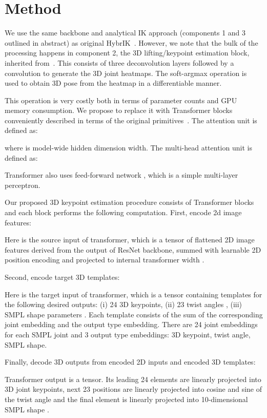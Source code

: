 \documentclass[sigconf,final]{acmart}
\begin{document}
\section{Method}

We use the same backbone and analytical IK approach (components 1 and 3 outlined in abstract) as original HybrIK~\cite{li2021hybrik}. However, we note that the bulk of the processing happens in component 2, the 3D lifting/keypoint estimation block, inherited from~\cite{integral}. This consists of three deconvolution layers followed by a  convolution to generate the 3D joint heatmaps. The soft-argmax operation is used to obtain 3D pose from the heatmap in a differentiable manner. 

This operation is very costly both in terms of parameter counts and GPU memory consumption. We propose to replace it with Transformer blocks conveniently described in terms of the original primitives~\cite{vaswani2017attention}. The attention unit is defined as:

where  is model-wide hidden dimension width. The multi-head attention unit is defined as:

Transformer also uses feed-forward network , which is a simple multi-layer perceptron.

Our proposed 3D keypoint estimation procedure consists of  Transformer blocks and each block  performs the following computation. First, encode 2d image features:

Here  is the source input of transformer, which is a tensor of flattened 2D image features derived from the output of ResNet backbone, summed with learnable 2D position encoding and projected to internal transformer width . 

Second, encode target 3D templates:

Here  is the target input of transformer, which is a  tensor containing templates for the following desired outputs: (i) 24 3D keypoints, (ii) 23 twist angles , (iii) SMPL shape parameters . Each template consists of the sum of the corresponding joint embedding and the output type embedding. There are 24 joint embeddings for each SMPL joint and 3 output type embeddings: 3D keypoint, twist angle, SMPL shape.

Finally, decode 3D outputs from encoded 2D inputs and encoded 3D templates:

Transformer output  is a  tensor. Its leading 24 elements are linearly projected into 3D joint keypoints, next 23 positions are linearly projected into cosine and sine of the twist angle and the final element is linearly projected into 10-dimensional SMPL shape .
\end{document}
